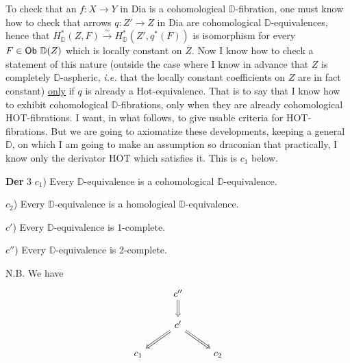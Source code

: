 \documentclass[11pt]{article}
\newcommand{\msp}[1]{\marginpar{\footnotesize [#1]}}
\newcommand{\D}{\mathbb{D}}
\newcommand{\sfup}[1]{\textsf{\upshape #1}}
\newcommand{\Dia}{\sfup{Dia}}
\newcommand{\Hot}{\sfup{Hot}}
\newcommand{\HOT}{\sfup{HOT}}
\newcommand{\Ob}{\sfup{Ob}}
\begin{document}
To check that an $f : X \to Y$ in \Dia{} is a cohomological $\D$-fibration, one must
\msp{page 124}know how to check that arrows $q : Z' \to Z$ in \Dia{} are cohomological $\D$-equivalences, hence that $H^*_{\D}(Z,F) \overset{\sim}{\rightarrow} H^*_{\D}(Z',q^*(F))$ is isomorphism for every $F \in \Ob\ \D(Z)$ which is locally constant on $Z$. Now I know how to check a statement of this nature (outside the case where I know in advance that $Z$ is completely $\D$-aspheric, \textit{i.e.} that the locally constant coefficients on $Z$ are in fact constant) \underline{only} if $q$ is already a \Hot-equivalence. %
That is to say that I know how to exhibit cohomological $\D$-fibrations, only when they are already cohomological \HOT-fibrations. I want, in what follows, to give usable criteria for \HOT-fibrations. But we are going to axiomatize these developments, keeping a general $\D$, on which I am going to make an assumption so draconian that practically, I know only the derivator \HOT{} which satisfies it. This is $c_1$ below.

\textbf{Der} 3 $c_1$) Every $\D$-equivalence is a cohomological $\D$-equivalence.

$c_2$) Every $\D$-equivalence is a homological $\D$-equivalence.

\msp{page 125}$c'$) Every $\D$-equivalence is 1-complete.

$c''$) Every $\D$-equivalence is 2-complete.

N.B. We have
\[
\begin{tikzcd}
& c'' \arrow[d, Rightarrow] & \\
& c' \arrow[dl, Rightarrow] \arrow[dr, Rightarrow] & \\
c_1 & & c_2
\end{tikzcd}
\]
\end{document}
